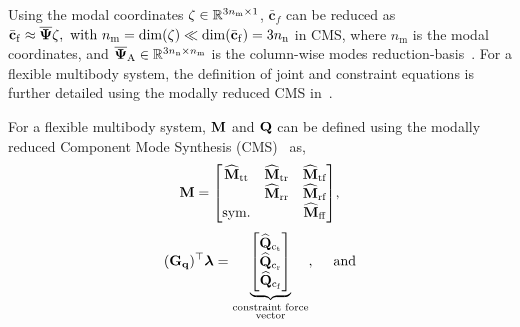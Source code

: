 Using the modal coordinates ${{\mathbf{\zeta}}} \in \mathbb{R}^{3n_{\text{m}} \times 1}$, $\bar{\mathbf{c}}_{f}$ can be reduced as ${\bar{\mathbf{c}}}_{{\mathrm{f}}} \approx {\overline{{\bm{\Psi}}}} {{\mathbf{\zeta}}},~\text{with}~n_{\text{m}}=\dim({{\mathbf{\zeta}}}) \ll \dim({\bar{\mathbf{c}}}_{{\mathrm{f}}}) = 3n_{\text{n}}$ in CMS, where $n_{\text{m}}$ is the modal coordinates, and ${\overline{{\bm{\Psi}}}}_\text{A}  \in \mathbb{R}^{3n_{\text{n}} \times n_{\text{m}}}$ is the column-wise modes reduction-basis~\cite{zwlfer_2019_a,zwolfer2021nodal}. For a flexible multibody system, the definition of joint and constraint equations is further detailed using the modally reduced CMS in~\cite{Johannes2024}.

For a flexible multibody system, ${\mathbf{M}}$ and ${\mathbf{Q}}$ can be defined using the modally reduced Component Mode Synthesis (CMS)~\cite{zwolfer2021nodal} as,
\begin{equation} \label{Eq03_04: ConstraintsAndForces1}
{\mathbf{M}} = {\begin{bmatrix}
    {{\mathbf{\widehat{M}_{\text{tt}}}}}  & {{\mathbf{\widehat{M}_{\text{tr}}}}} & {{\mathbf{\widehat{M}_{\text{tf}}}}}\\
    & {{\mathbf{\widehat{M}_{\text{rr}}}}} & {{\mathbf{\widehat{M}_{\text{rf}}}}} \\
    \text{sym.} &  & {{\mathbf{\widehat{M}_{\text{ff}}}}}
\end{bmatrix}},  
\end{equation}
\begin{equation} \label{Eq03_04: ConstraintsAndForces2}
{ ({\mathbf{G}}_{{\mathbf{q}}})^{\top} \bm{\lambda}} = \underbrace{\begin{bmatrix}
     \mathbf{\widehat{Q}_{\text{c}_{\text{t}}}} \\
     \mathbf{\widehat{Q}_{\text{c}_{\text{r}}}} \\
     \mathbf{\widehat{Q}_{\text{c}_{\text{f}}}} 
\end{bmatrix}}_{\substack{\text{constraint force} \\ \text{vector}}}, \quad~\text{and}
\end{equation}
